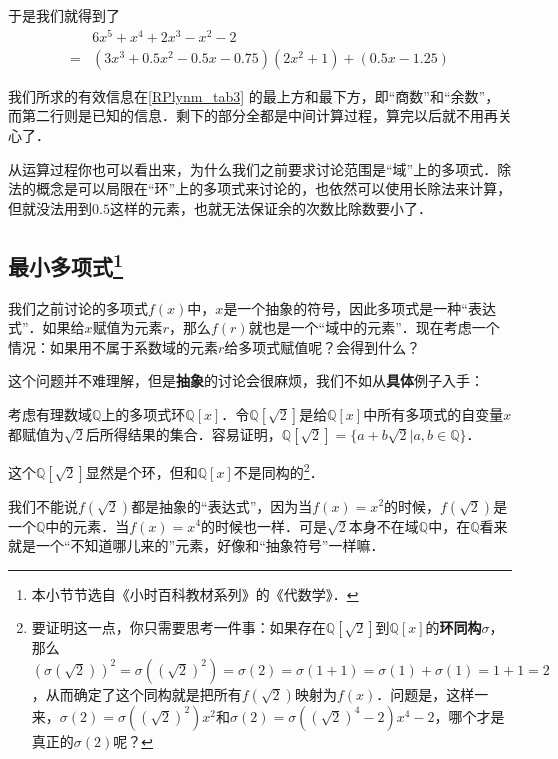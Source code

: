 于是我们就得到了
\begin{equation}
\begin{aligned}
&6x^5+x^4+2x^3-x^2-2 \\
= &(3x^3+0.5x^2-0.5x-0.75)(2x^2+1)+(0.5x-1.25)
\end{aligned}
\end{equation}

我们所求的有效信息在\autoref{RPlynm_tab3} 的最上方和最下方，即“商数”和“余数”，而第二行则是已知的信息．剩下的部分全都是中间计算过程，算完以后就不用再关心了．

从运算过程你也可以看出来，为什么我们之前要求讨论范围是“域”上的多项式．除法的概念是可以局限在“环”上的多项式来讨论的，也依然可以使用长除法来计算，但就没法用到$0.5$这样的元素，也就无法保证余的次数比除数要小了．





\subsection{最小多项式\footnote{本小节节选自《小时百科教材系列》的《代数学》．}}

我们之前讨论的多项式$f(x)$中，$x$是一个抽象的符号，因此多项式是一种“表达式”．如果给$x$赋值为元素$r$，那么$f(r)$就也是一个“域中的元素”．现在考虑一个情况：如果用不属于系数域的元素$r$给多项式赋值呢？会得到什么？

这个问题并不难理解，但是\textbf{抽象}的讨论会很麻烦，我们不如从\textbf{具体}例子入手：

\begin{example}{}

考虑有理数域$\mathbb{Q}$上的多项式环$\mathbb{Q}[x]$．令$\mathbb{Q}[\sqrt{2}]$是给$\mathbb{Q}[x]$中所有多项式的自变量$x$都赋值为$\sqrt{2}$后所得结果的集合．容易证明，$\mathbb{Q}[\sqrt{2}]=\{ a+b\sqrt{2}|a, b\in\mathbb{Q} \}$．

这个$\mathbb{Q}[\sqrt{2}]$显然是个环，但和$\mathbb{Q}[x]$不是同构的\footnote{要证明这一点，你只需要思考一件事：如果存在$\mathbb{Q}[\sqrt{2}]$到$\mathbb{Q}[x]$的\textbf{环同构}$\sigma$，那么$(\sigma(\sqrt{2}))^2=\sigma((\sqrt{2})^2)=\sigma(2)=\sigma(1+1)=\sigma(1)+\sigma(1)=1+1=2$，从而确定了这个同构就是把所有$f(\sqrt{2})$映射为$f(x)$．问题是，这样一来，$\sigma(2)=\sigma((\sqrt{2})^2)x^2$和$\sigma(2)=\sigma((\sqrt{2})^4-2)x^4-2$，哪个才是真正的$\sigma(2)$呢？}．


\end{example}


我们不能说$f(\sqrt{2})$都是抽象的“表达式”，因为当$f(x)=x^2$的时候，$f(\sqrt{2})$是一个$\mathbb{Q}$中的元素．当$f(x)=x^4$的时候也一样．可是$\sqrt{2}$本身不在域$\mathbb{Q}$中，在$\mathbb{Q}$看来就是一个“不知道哪儿来的”元素，好像和“抽象符号”一样嘛．

